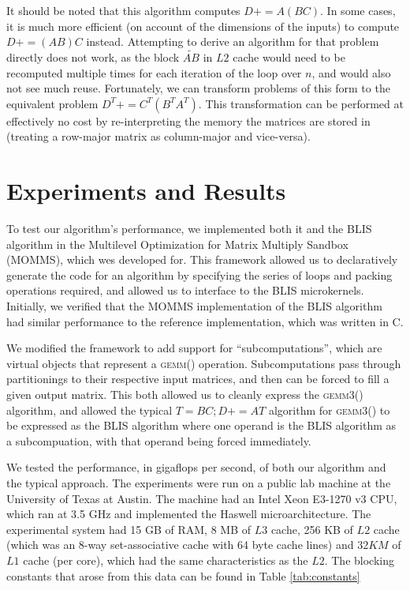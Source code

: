 \documentclass[12pt]{article}
\newcommand*{\pluseq}{\mathrel{{+}{=}}}
\newcommand*{\gemmt}{{\textsc{gemm3()}}}
\newcommand*{\gemm}{{\textsc{gemm()}}}
\begin{document}
It should be noted that this algorithm computes $D \pluseq A(BC)$.
In some cases, it is much more efficient (on account of the dimensions of the inputs) to compute $D \pluseq (AB)C$ instead.
Attempting to derive an algorithm for that problem directly does not work, as the block $\tilde{AB}$ in $L2$ cache would need to be recomputed multiple times for each iteration of the loop over $n$, and would also not see much reuse.
Fortunately, we can transform problems of this form to the equivalent problem $D^T \pluseq C^T(B^TA^T)$.
This transformation can be performed at effectively no cost by re-interpreting the memory the matrices are stored in (treating a row-major matrix as column-major and vice-versa).

\section{Experiments and Results}
To test our algorithm's performance, we implemented both it and the BLIS algorithm in the Multilevel Optimization for Matrix Multiply Sandbox (MOMMS), which wes developed for\cite{SmithDiss2017}.
This framework allowed us to declaratively generate the code for an algorithm by specifying the series of loops and packing operations required, and allowed us to interface to the BLIS microkernels.
Initially, we verified that the MOMMS implementation of the BLIS algorithm had similar performance to the reference implementation, which was written in C.

We modified the framework to add support for ``subcomputations'', which are virtual objects that represent a \gemm{} operation.
Subcomputations pass through partitionings to their respective input matrices, and then can be forced to fill a given output matrix.
This both allowed us to cleanly express the \gemmt{} algorithm, and allowed the typical $T = BC; D \pluseq AT$ algorithm for \gemmt{} to be expressed as the BLIS algorithm where one operand is the BLIS algorithm as a subcompuation, with that operand being forced immediately.

We tested the performance, in gigaflops per second, of both our algorithm and the typical approach.
The experiments were run on a public lab machine at the University of Texas at Austin.
The machine had an Intel Xeon E3-1270 v3 CPU, which ran at 3.5 GHz and implemented the Haswell microarchitecture.
The experimental system had 15 GB of RAM, 8 MB of $L3$ cache, 256 KB of $L2$ cache (which was an 8-way set-associative cache with 64 byte cache lines) and $32 KM$ of $L1$ cache (per core), which had the same characteristics as the $L2$.
The blocking constants that arose from this data can be found in Table \ref{tab:constants}
\end{document}
